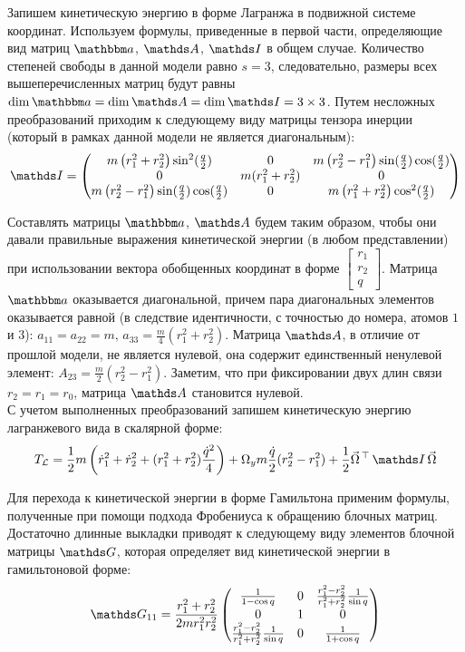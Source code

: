 Запишем кинетическую энергию в форме Лагранжа в подвижной системе координат. Используем формулы, приведенные в первой части, определяющие вид матриц $\bba$, $\bbA$, $\bbI$ в общем случае. Количество степеней свободы в данной модели равно $s = 3$, следовательно, размеры всех вышеперечисленных матриц будут равны $\dim \bba = \dim \bbA = \dim \bbI = 3 \times 3$. Путем несложных преобразований приходим к следующему виду матрицы тензора инерции (который в рамках данной модели не является диагональным):
\vverh
\begin{gather}
\bbI = \begin{pmatrix}
m \left( r_1^2 + r_2^2 \right) \sin^2 (\frac{q}{2}) & 0 & m \left( r_2^2 - r_1^2 \right) \sin (\frac{q}{2}) \cos(\frac{q}{2}) \\
0 & m (r_1^2 + r_2^2) & 0 \\
m \left( r_2^2 - r_1^2 \right) \sin(\frac{q}{2}) \cos(\frac{q}{2}) & 0 & m \left( r_1^2 + r_2^2 \right) \cos^2 (\frac{q}{2})
\end{pmatrix} \notag
\end{gather}

Составлять матрицы $\bba$, $\bbA$ будем таким образом, чтобы они давали правильные выражения кинетической энергии (в любом представлении) при использовании вектора обобщенных координат в форме $\begin{bmatrix} r_1 \\ r_2 \\ q \end{bmatrix}$. Матрица $\bba$ оказывается диагональной, причем пара диагональных элементов оказывается равной (в следствие идентичности, с точностью до номера, атомов $1$ и $3$): $a_{11} = a_{22} = m, \, a_{33} = \frac{m}{4} (r_1^2 + r_2^2)$. Матрица $\bbA$, в отличие от прошлой модели, не является нулевой, она содержит единственный ненулевой элемент: $A_{23} = \frac{m}{2} (r_2^2 - r_1^2)$. Заметим, что при фиксировании двух длин связи $r_2 = r_1 = r_0$, матрица $\bbA$ становится нулевой. \\
С учетом выполненных преобразований запишем кинетическую энергию лагранжевого вида в скалярной форме: 
\vverh
\begin{gather}
T_\mathcal{L} = \frac{1}{2} m \left(\dot{r}_1^2 + \dot{r}_2^2 + ( r_1^2 + r_2^2 ) \frac{\dot{q}^2}{4} \right) + \Omega_y m \frac{\dot{q}}{2} (r_2^2 - r_1^2 ) + \frac{1}{2} \vec{\Omega}^{\, \top} \, \bbI \, \vec{\Omega} \notag 
\end{gather}

Для перехода к кинетической энергии в форме Гамильтона применим формулы, полученные при помощи подхода Фробениуса к обращению блочных матриц. Достаточно длинные выкладки приводят к следующему виду элементов блочной матрицы $\bbG$, которая определяет вид кинетической энергии в гамильтоновой форме:
\vverh
\begin{gather}
\bbG_{11} = \frac{r_1^2 + r_2^2}{2 m r_1^2 r_2^2}
\begin{pmatrix}
\frac{1}{1 - \cos q} & 0 & \frac{r_1^2 - r_2^2}{r_1^2 + r_2^2}  \frac{1}{\sin q} \\
0 & 1 & 0 \\
\frac{r_1^2 - r_2^2}{r_1^2 + r_2^2} \frac{1}{\sin q} & 0 & \frac{1}{1 + \cos q}
\end{pmatrix} \notag
\end{gather}